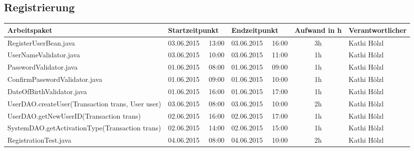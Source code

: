 \begin{landscape}
\subsection{Registrierung}
\begin{tabular}{|p{10.3cm}|p{3.2cm}|p{3.2cm}|c|p{3.5cm}|}
	\hline  \textbf{Arbeitspaket} & \textbf{Startzeitpunkt} & \textbf{Endzeitpunkt} & \textbf{Aufwand in h} & \textbf{Verantwortlicher} \\ 
	\hline   RegisterUserBean.java                                & 03.06.2015 \ \ 13:00     & 03.06.2015 \ \ 16:00     &      3h               & Kathi Hölzl\\
	\hline   UserNameValidator.java                               & 03.06.2015 \ \ 10:00     & 03.06.2015 \ \ 11:00     &      1h               & Kathi Hölzl\\
	\hline   PasswordValidator.java                               & 01.06.2015 \ \ 08:00     & 01.06.2015 \ \ 09:00     &      1h               & Kathi Hölzl\\
	\hline   ConfirmPasswordValidator.java                        & 01.06.2015 \ \ 09:00     & 01.06.2015 \ \ 10:00     &      1h               & Kathi Hölzl\\
	\hline   DateOfBirthValidator.java                            & 01.06.2015 \ \ 16:00     & 01.06.2015 \ \ 17:00     &      1h               & Kathi Hölzl\\
	\hline   UserDAO.createUser(Transaction trans, User user)     & 03.06.2015 \ \ 08:00     & 03.06.2015 \ \ 10:00     &      2h               & Kathi Hölzl\\
	\hline   UserDAO.getNewUserID(Transaction trans)              & 02.06.2015 \ \ 16:00     & 02.06.2015 \ \ 17:00     &      1h              & Kathi Hölzl\\
	\hline   SystemDAO.getActivationType(Transaction trans)       & 02.06.2015 \ \ 14:00     & 02.06.2015 \ \ 15:00     &      1h               & Kathi Hölzl\\
	\hline   RegistrationTest.java                                & 04.06.2015 \ \ 08:00     & 04.06.2015 \ \ 10:00     &      2h               & Kathi Hölzl\\
	\hline 
\end{tabular} \ \\
\ \\


\end{landscape}
